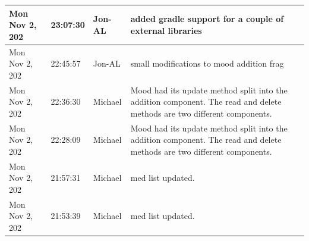 \documentclass[11pt]{article}
\begin{document}
\begin{center}
\begin{longtable}{|p{2.7cm}|l|p{2cm}|p{8cm}|}
           \hline Mon Nov 2,  202                              & 23:07:30                           & Jon-AL                                  & added gradle support for a couple of external libraries                                                                                                                                                                                                                                                    \\
           \hline Mon Nov 2,  202                              & 22:45:57                           & Jon-AL                                  & small modifications to mood addition frag                                                                                                                                                                                                                                                                  \\
           \hline Mon Nov 2,  202                              & 22:36:30                           & Michael                                 & Mood had its update method split into the addition component. The read and delete methods are two different components.                                                                                                                                                                                    \\
           \hline Mon Nov 2,  202                              & 22:28:09                           & Michael                                 & Mood had its update method split into the addition component. The read and delete methods are two different components.                                                                                                                                                                                    \\
           \hline Mon Nov 2,  202                              & 21:57:31                           & Michael                                 & med list updated.                                                                                                                                                                                                                                                                                          \\
           \hline Mon Nov 2,  202                              & 21:53:39                           & Michael                                 & med list updated.                                                                                                                                                                                                                                                                                          \\

\end{longtable}
\end{center}
\end{document}
